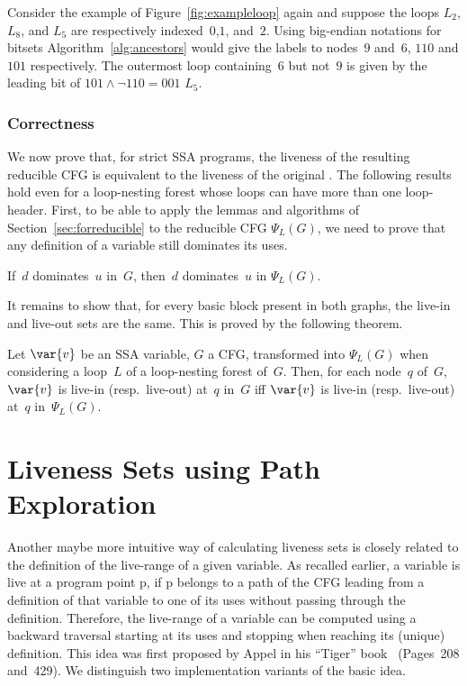 \begin{example}
	Consider the example of Figure~\ref{fig:exampleloop} again and suppose the loops $L_2$, $L_8$, and $L_5$ are respectively indexed~$0$,$1$, and~$2$.
	Using big-endian notations for bitsets Algorithm~\ref{alg:ancestors} would give the labels to nodes~$9$ and~$6$, $110$ and $101$ respectively.
	The outermost loop containing~$6$ but not~$9$ is given by the leading bit of $101\wedge \lnot 110=001$ \ie $L_5$.
\end{example}

\subsubsection{Correctness}
\label{sec:equiv_correctness}

We now prove that, for strict SSA programs, the liveness of the resulting reducible CFG is equivalent to the liveness of the original \@CFG.
The following results hold even for a loop-nesting forest whose loops can have more than one loop-header.
First, to be able to apply the lemmas and algorithms of Section~\ref{sec:forreducible} to the reducible CFG $\Psi_L(G)$, we need to prove that any definition of a variable still dominates its uses.

\begin{lemma}
\label{lemma:dom_psi}
If~$d$ dominates~$u$ in~$G$, then~$d$ dominates~$u$ in $\Psi_L(G)$.
\end{lemma}

It remains to show that, for every basic block present in both graphs, the live-in and live-out sets are the same.
This is proved by the following theorem.
\begin{theorem}
\label{thm:equiv}
Let $\var{v}$ be an SSA variable, $G$ a CFG, transformed into $\Psi_L(G)$ when considering a loop~$L$ of a loop-nesting forest of~$G$.
Then, for each node~$q$ of~$G$, $\var{v}$ is live-in (resp.\ live-out) at~$q$ in~$G$ iff $\var{v}$ is live-in (resp.\ live-out) at~$q$ in~$\Psi_L (G)$.
\end{theorem}




\section{Liveness Sets using Path Exploration}
\label{sec:path-explore}

Another maybe more intuitive way of calculating liveness sets is closely related to the definition of the live-range of a given variable.
As recalled earlier, a variable is live at a program point p, if p belongs to a path of the CFG leading from a definition of that variable to one of its uses without passing through the definition.
Therefore, the live-range of a variable can be computed using a backward traversal starting at its uses and stopping when reaching its (unique) definition.
This idea was first proposed by Appel in his ``Tiger'' book~\cite{appel:2002:modern} (Pages~208 and~429).
We distinguish two implementation variants of the basic idea.



